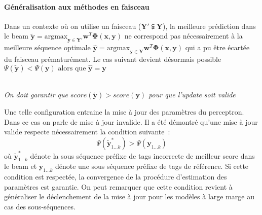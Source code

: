 \documentclass[11pt,openany]{book}
\begin{document}
\paragraph{Généralisation aux méthodes en faisceau}
Dans un contexte où on utilise un faisceau ($\mathbf{Y}' \subsetneqq \mathbf{Y}$), la meilleure prédiction dans le
beam $\tilde{\mathbf{y}} = \text{argmax}_{\mathbf{y} \in \mathbf{Y'}}
\mathbf{w}^T \boldsymbol\Phi(\mathbf{x},\mathbf{y})$ ne correspond pas nécessairement à
la meilleure séquence optimale $\hat{\mathbf{y}} = \text{argmax}_{\mathbf{y} \in \mathbf{Y}}
\mathbf{w}^T \boldsymbol\Phi(\mathbf{x},\mathbf{y})$ qui a pu être écartée du faisceau prématurément.  
Le cas suivant devient désormais possible $\Psi(\tilde{\mathbf{y}}) < \Psi(\mathbf{y}) \text{ alors que } \hat{\mathbf{y}} = \mathbf{y}$
\begin{center}
\\{\em On doit garantir que $score(\tilde{\mathbf{y}}) > score(\mathbf{y})$ pour que l'update
soit valide}
\end{center}


Une telle configuration entraine la mise à jour des paramètres du perceptron. Dans
ce cas on parle de mise à jour invalide. Il a été démontré
\cite{huang-2012} qu'une mise à jour valide respecte nécessairement la
condition suivante~: 
\begin{displaymath}
\Psi(\tilde{\mathbf{y}}_{1\ldots k}^*) > \Psi(\mathbf{y}_{1\ldots k})
\end{displaymath}
où $\tilde{\mathbf{y}}_{1\ldots k}^*$ dénote la sous séquence préfixe
de tags incorrecte de meilleur score dans le beam et  $\mathbf{y}_{1\ldots k}$
dénote une sous séquence préfixe de tags de référence.
Si cette condition est respectée, la convergence de la procédure d'estimation des paramètres
est garantie. On peut remarquer que cette condition revient à
généraliser le déclenchement de la mise à jour pour les modèles à
large marge au cas des sous-séquences.
\end{document}
